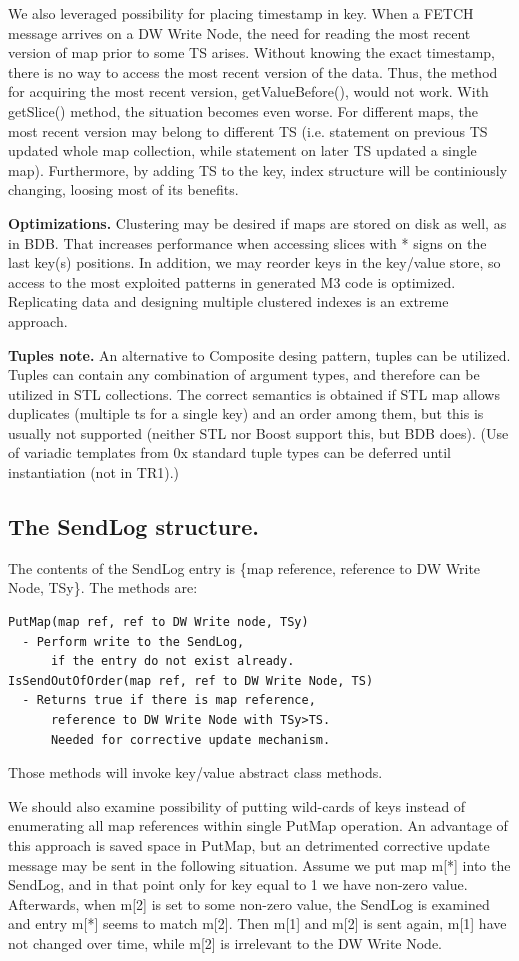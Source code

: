 \documentclass{sig-semester}
\def\M3{M3\xspace}
\begin{document}
We also leveraged possibility for placing timestamp in key. When a FETCH message arrives on a DW Write Node, the need for reading the most recent version of map prior to some TS arises. Without knowing the exact timestamp, there is no way to access the most recent version of the data. Thus, the method for acquiring the most recent version, getValueBefore(), would not work. With getSlice() method, the situation becomes even worse. For different maps, the most recent version may belong to different TS (i.e. statement on previous TS updated whole map collection, while statement on later TS updated a single map). Furthermore, by adding TS to the key, index structure will be continiously changing, loosing most of its benefits.

\textbf{Optimizations.} Clustering may be desired if maps are stored on disk as well, as in BDB. That increases performance when accessing slices with * signs on the last key(s) positions. In addition, we may reorder keys in the key/value store, so access to the most exploited patterns in generated \M3 code is optimized. Replicating data and designing multiple clustered indexes is an extreme approach.

\textbf{Tuples note.} An alternative to Composite desing pattern, tuples can be utilized. Tuples can contain any combination of argument types, and therefore can be utilized in STL collections. The correct semantics is obtained if STL map allows duplicates (multiple ts for a single key) and an order among them, but this is usually not supported (neither STL nor Boost support this, but BDB does). (Use of variadic templates from 0x standard tuple types can be deferred until instantiation (not in TR1).)

\subsection{The SendLog structure.}
The contents of the SendLog entry is \{map reference, reference to DW Write Node, TSy\}. The methods are:
\begin{verbatim}
PutMap(map ref, ref to DW Write node, TSy)
  - Perform write to the SendLog, 
      if the entry do not exist already.
IsSendOutOfOrder(map ref, ref to DW Write Node, TS)
  - Returns true if there is map reference, 
      reference to DW Write Node with TSy>TS. 
      Needed for corrective update mechanism. 
\end{verbatim}
Those methods will invoke key/value abstract class methods.

We should also examine possibility of putting wild-cards of keys instead of enumerating all map references within single PutMap operation. An advantage of this approach is saved space in PutMap, but an detrimented corrective update message may be sent in the following situation. Assume we put map m[*] into the SendLog, and in that point only for key equal to 1 we have non-zero value. Afterwards, when m[2] is set to some non-zero value, the SendLog is examined and entry m[*] seems to match m[2]. Then m[1] and m[2] is sent again, m[1] have not changed over time, while m[2] is irrelevant to the DW Write Node.
\end{document}
